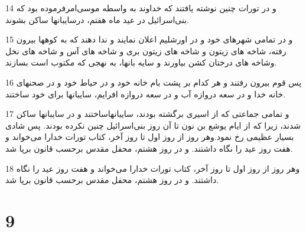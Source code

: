 \par 14 و در تورات چنین نوشته یافتند که خداوند به واسطه موسی‌امرفرموده بود که بنی‌اسرائیل در عید ماه هفتم، درسایبانها ساکن بشوند.
\par 15 و در تمامی شهرهای خود و در اورشلیم اعلان نمایند و ندا دهند که به کوهها بیرون رفته، شاخه های زیتون و شاخه های زیتون بری و شاخه های آس و شاخه های نخل وشاخه های درختان کشن بیاورند و سایه بانها، به نهجی که مکتوب است بسازند.
\par 16 پس قوم بیرون رفتند و هر کدام بر پشت بام خانه خود و در حیاط خود و در صحنهای خانه خدا و در سعه دروازه آب و در سعه دروازه افرایم، سایبانها برای خود ساختند.
\par 17 و تمامی جماعتی که از اسیری برگشته بودند، سایبانهاساختند و در سایبانها ساکن شدند، زیرا که از ایام یوشع بن نون تا آن روز بنی‌اسرائیل چنین نکرده بودند. پس شادی بسیار عظیمی رخ نمود.وهر روز از روز اول تا روز آخر، کتاب تورات خدارا می‌خواند و هفت روز عید را نگاه داشتند. و در روز هشتم، محفل مقدس برحسب قانون برپا شد.
\par 18 وهر روز از روز اول تا روز آخر، کتاب تورات خدارا می‌خواند و هفت روز عید را نگاه داشتند. و در روز هشتم، محفل مقدس برحسب قانون برپا شد.
 
\chapter{9}

